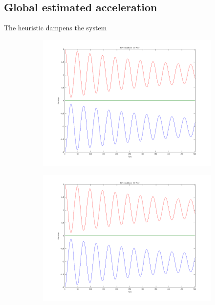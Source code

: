 \documentclass[11pt]{article}
\begin{document}
\subsection{Global estimated acceleration}

The heuristic dampens the system
\begin{figure}[H]
    \begin{subfigure}{0.5\textwidth}
        \includegraphics[width=\textwidth]{../images/inverse_uniform_10fps_0.png}
        \caption{}
        \label{fig:inverse_uniform_10fps_0}
    \end{subfigure}
    \begin{subfigure}{0.5\textwidth}
        \includegraphics[width=\textwidth]{../images/inverse_uniform_10fps_1.png}
        \caption{}
        \label{fig:inverse_uniform_10fps_1}
    \end{subfigure}
\end{figure}
\end{document}
